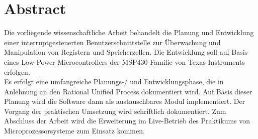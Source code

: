 
\chapter*{Abstract}
\label{cha:Abstract}

\thispagestyle{empty}


Die vorliegende wissenschaftliche Arbeit behandelt die Planung und Entwicklung einer interruptgesteuerten Benutzerschnittstelle zur Überwachung und Manipulation von Registern und Speicherzellen. Die Entwicklung soll auf Basis eines Low-Power-Microcontrollers der MSP430 Familie von Texas Instruments erfolgen.
\\
Es erfolgt eine umfangreiche Planungs-/ und Entwicklungsphase, die in Anlehnung an den Rational Unified Process dokumentiert wird. Auf Basis dieser Planung wird die Software dann als austauschbares Modul implementiert. Der Vorgang der praktischen Umsetzung wird schriftlich dokumentiert. Zum Abschluss der Arbeit wird die Erweiterung im Live-Betrieb des Praktikums von Microprozessorsysteme zum Einsatz kommen.